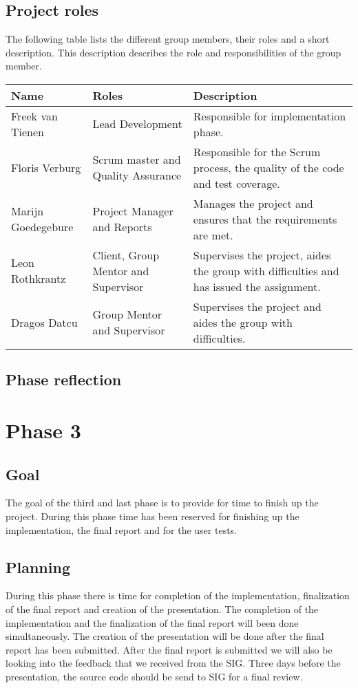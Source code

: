 \subsection{Project roles}
The following table lists the different group members, their roles and a short description.
This description describes the role and responsibilities of the group member.\\
\begin{tabular}{|l|l|p{5cm}|}
\hline
Name & Roles & Description\\
\hline
Freek van Tienen & Lead Development & Responsible for implementation phase.\\
\hline
Floris Verburg & Scrum master and Quality Assurance & Responsible for the Scrum process, the quality of the code and test coverage.\\
\hline
Marijn Goedegebure & Project Manager and Reports & Manages the project and ensures that the requirements are met.\\
\hline
Leon Rothkrantz & Client, Group Mentor and Supervisor & Supervises the project, aides the group with difficulties and has issued the assignment.\\
\hline
Dragos Datcu &  Group Mentor and Supervisor & Supervises the project and aides the group with difficulties.\\
\hline
\end{tabular}
\subsection{Phase reflection}

\section{Phase 3}
\subsection{Goal}
The goal of the third and last phase is to provide for time to finish up the project.
During this phase time has been reserved for finishing up the implementation, the final report and for the user tests.

\subsection{Planning}
During this phase there is time for completion of the implementation, finalization of the final report and creation of the presentation.
The completion of the implementation and the finalization of the final report will been done simultaneously.
The creation of the presentation will be done after the final report has been submitted.
After the final report is submitted we will also be looking into the feedback that we received from the SIG.
Three days before the presentation, the source code should be send to SIG for a final review.

